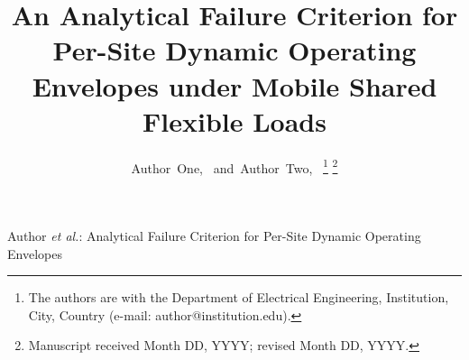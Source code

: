 \documentclass[lettersize,journal]{IEEEtran}
\begin{document}
\title{An Analytical Failure Criterion for Per-Site Dynamic Operating
Envelopes under Mobile Shared Flexible Loads}

\author{Author~One,~
        and~Author~Two,~%
\thanks{The authors are with the Department of Electrical Engineering,
Institution, City, Country (e-mail: author@institution.edu).}%
\thanks{Manuscript received Month DD, YYYY; revised Month DD, YYYY.}}

%
{Author \MakeLowercase{\textit{et al.}}: Analytical Failure Criterion for Per-Site Dynamic Operating Envelopes}

\maketitle
\end{document}
